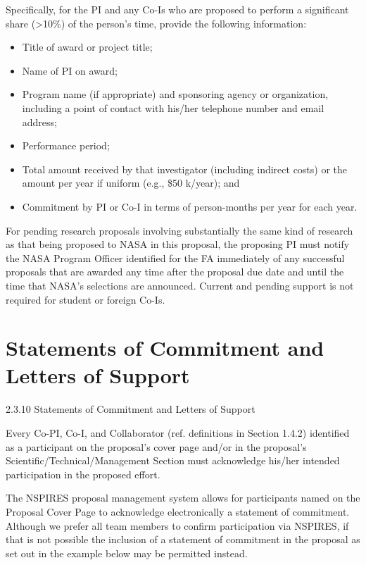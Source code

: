\documentclass[12pt]{article}
\begin{document}
Specifically, for the PI and any Co-Is who are proposed to perform a
significant share (>10\%) of the person's time, provide the following
information:
\begin{itemize}
\item Title of award or project title;
\item Name of PI on award;
\item Program name (if appropriate) and sponsoring agency or organization,
  including a point of contact with his/her telephone number and email
  address;
\item Performance period;
\item Total amount received by that investigator (including indirect
  costs) or the amount per year if uniform (e.g., \$50 k/year); and
\item Commitment by PI or Co-I in terms of person-months per year for each
  year.
\end{itemize}

For pending research proposals involving substantially the same kind
of research as that being proposed to NASA in this proposal, the
proposing PI must notify the NASA Program Officer identified for the
FA immediately of any successful proposals that are awarded any time
after the proposal due date and until the time that NASA's selections
are announced.  Current and pending support is not required for
student or foreign Co-Is.



\cleardoublepage

\section*{Statements of Commitment and Letters of Support}
2.3.10 Statements of Commitment and Letters of Support

Every Co-PI, Co-I, and Collaborator (ref. definitions in Section
1.4.2) identified as a participant on the proposal's cover page and/or
in the proposal's Scientific/Technical/Management Section must
acknowledge his/her intended participation in the proposed effort.

The NSPIRES proposal management system allows for participants named
on the Proposal Cover Page to acknowledge electronically a statement
of commitment. Although we prefer all team members to confirm
participation via NSPIRES, if that is not possible the inclusion of a
statement of commitment in the proposal as set out in the example
below may be permitted instead.
\end{document}

